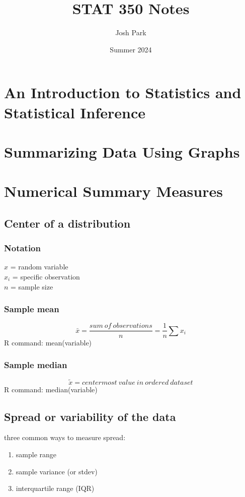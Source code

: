 \documentclass{report}
\title{STAT 350 Notes}
\author{Josh Park}
\date{Summer 2024}
\begin{document}
\maketitle
\chapter{An Introduction to Statistics and Statistical Inference}

\chapter{Summarizing Data Using Graphs}

\chapter{Numerical Summary Measures}

	\section{Center of a distribution}
    \subsection{Notation}
    $x$ = random variable\\
    $x_i$ = specific observation\\
    $n$ = sample size

    \subsection{Sample mean}
    \[\bar{x}=\frac{sum\ of\ observations}{n}=\frac{1}{n}\sum x_i\]
    R command: mean(variable)

    \subsection{Sample median} 
    \[\tilde{x}= centermost\ value\ in\ ordered\ dataset\]
    R command: median(variable)

	\section{Spread or variability of the data}
	three common ways to measure spread:
	\begin{enumerate}
		\item sample range
		\item sample variance (or stdev)
		\item interquartile range (IQR)
	\end{enumerate}
\end{document}
